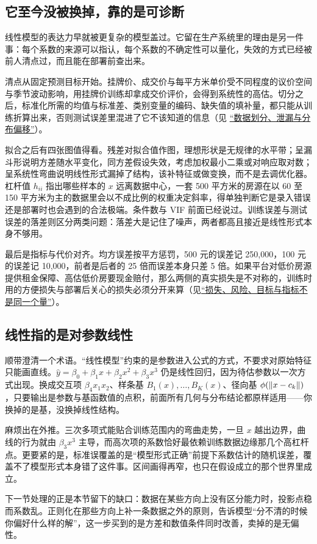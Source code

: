 \subsection{它至今没被换掉，靠的是可诊断}

线性模型的表达力早就被更复杂的模型盖过。它留在生产系统里的理由是另一件事：每个系数的来源可以指认，每个系数的不确定性可以量化，失效的方式已经被前人清点过，而且能在部署前查出来。

清点从固定预测目标开始。挂牌价、成交价与每平方米单价受不同程度的议价空间与季节波动影响，用挂牌价训练却拿成交价评价，会得到系统性的高估。切分之后，标准化所需的均值与标准差、类别变量的编码、缺失值的填补量，都只能从训练折算出来，否则测试误差里混进了它不该知道的信息（见 \hyperref[sec:13-Machine-Learning/01-Learning-Problems-and-Evaluation/04]{``数据划分、泄漏与分布偏移''}）。

拟合之后有四张图值得看。残差对拟合值作图，理想形状是无规律的水平带；呈漏斗形说明方差随水平变化，同方差假设失效，考虑加权最小二乘或对响应取对数；呈系统性弯曲说明线性形式漏掉了结构，该补特征或做变换，而不是去调优化器。杠杆值 \(h_{ii}\) 指出哪些样本的 \(x\) 远离数据中心，一套 500 平方米的房源在以 60 至 150 平方米为主的数据里会以不成比例的权重决定斜率，得单独判断它是录入错误还是部署时也会遇到的合法极端。条件数与 VIF 前面已经说过。训练误差与测试误差的落差则区分两类问题：落差大是记住了噪声，两者都高且接近是线性形式本身不够用。

最后是指标与代价对齐。均方误差按平方惩罚，500 元的误差记 250{,}000，100 元的误差记 10{,}000，前者是后者的 25 倍而误差本身只差 5 倍。如果平台对低价房源提供租金保障、高估低价房要现金赔付，那么两侧的真实损失是不对称的，训练时用的方便损失与部署后关心的损失必须分开来算（见\hyperref[sec:13-Machine-Learning/01-Learning-Problems-and-Evaluation/02]{``损失、风险、目标与指标不是同一个量''}）。

\subsection{线性指的是对参数线性}

顺带澄清一个术语。``线性模型''约束的是参数进入公式的方式，不要求对原始特征只能画直线。\(\widehat y=\beta_0+\beta_1x+\beta_2x^2+\beta_3x^3\) 仍是线性回归，因为待估参数以一次方式出现。换成交互项 \(\beta_4x_1x_2\)、样条基 \(B_1(x),\ldots,B_K(x)\)、径向基 \(\phi(\left\lVert x-c_k\right\rVert)\)，只要输出是参数与基函数值的点积，前面所有几何与分布结论都原样适用——你换掉的是基，没换掉线性结构。

麻烦出在外推。三次多项式能贴合训练范围内的弯曲走势，一旦 \(x\) 越出边界，曲线的行为就由 \(\beta_3x^3\) 主导，而高次项的系数恰好最依赖训练数据边缘那几个高杠杆点。更要紧的是，标准误覆盖的是``模型形式正确''前提下系数估计的随机误差，覆盖不了模型形式本身错了这件事。区间画得再窄，也只在假设成立的那个世界里成立。

下一节处理的正是本节留下的缺口：数据在某些方向上没有区分能力时，投影点稳而系数乱。正则化在那些方向上补一条数据之外的原则，告诉模型``分不清的时候你偏好什么样的解''，这一步买到的是方差和数值条件同时改善，卖掉的是无偏性。
